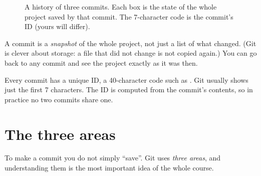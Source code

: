 \begin{figure}[H]
\centering
{}
\caption{A history of three commits. Each box is the state of the whole project saved by that commit. The 7-character code is the commit's ID (yours will differ).}
\label{fig:chain}
\end{figure}

\begin{keyidea}
A commit is a \emph{snapshot} of the whole project, not just a list of what changed. (Git is clever about storage: a file that did not change is not copied again.) You can go back to any commit and see the project exactly as it was then.
\end{keyidea}

\begin{quickfact}
Every commit has a unique ID, a 40-character code such as . Git usually shows just the first 7 characters. The ID is computed from the commit's contents, so in practice no two commits share one.
\end{quickfact}

\section{The three areas}

To make a commit you do not simply ``save''. Git uses \emph{three areas}, and understanding them is the most important idea of the whole course.

